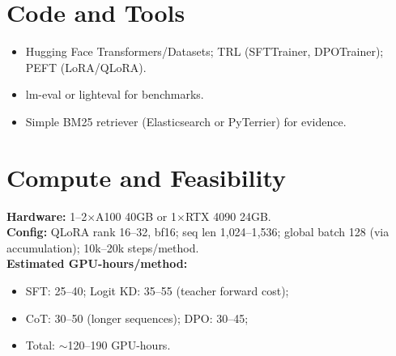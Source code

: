 \documentclass[10pt]{article}
\begin{document}
\section*{Code and Tools}
\begin{itemize}
\item Hugging Face Transformers/Datasets; TRL (SFTTrainer, DPOTrainer); PEFT (LoRA/QLoRA).
\item lm-eval or lighteval for benchmarks.
\item Simple BM25 retriever (Elasticsearch or PyTerrier) for evidence.
\end{itemize}

\section*{Compute and Feasibility}
\textbf{Hardware:} 1--2$\times$A100 40GB or 1$\times$RTX 4090 24GB.\
\\
\textbf{Config:} QLoRA rank 16--32, bf16; seq len 1{,}024--1{,}536; global batch 128 (via accumulation); 10k--20k steps/method.\
\\
\textbf{Estimated GPU-hours/method:}
\begin{itemize}
\item SFT: 25--40; Logit KD: 35--55 (teacher forward cost);
\item CoT: 30--50 (longer sequences); DPO: 30--45;
\item Total: $\sim$120--190 GPU-hours.
\end{itemize}

\newpage
\nocite{*}
\printbibliography
\end{document}
